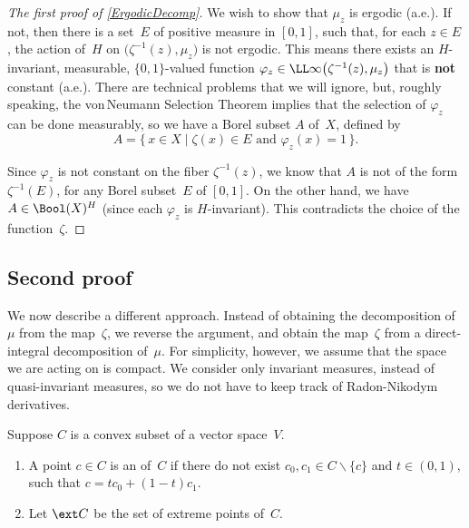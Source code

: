 \begin{proof}[The first proof of \cref{ErgodicDecomp}]
We wish to show that $\mu_z$ is ergodic (a.e.). If not, then there is a set~$E$ of positive measure in $[0,1]$, such that, for each $z \in E$, the action of~$H$ on $\bigl( \zeta^{-1}(z), \mu_z \bigr)$ is not ergodic. This means there exists an $H$-invariant, measurable, $\{0,1\}$-valued function $\varphi_z \in \LL\infty \bigl( \zeta^{-1}(z), \mu_z \bigr)$ that is \textbf{not} constant (a.e.).
There are technical problems that we will ignore, but, roughly speaking, the  von\,Neumann Selection Theorem  implies that the selection of $\varphi_z$ can be done measurably, so we have a Borel subset $A$ of~$X$, defined by
	$$ A = \{\, x \in X \mid \text{$\zeta(x) \in E$ and $\varphi_z(x) = 1 $} \,\} .$$

Since $\varphi_z$ is not constant on the fiber $\zeta^{-1}(z)$, we know that $A$ is not of the form $\zeta^{-1}(E)$, for any Borel subset~$E$ of $[0,1]$. On the other hand, we have $A \in \Bool(X)^H$ (since each $\varphi_z$ is $H$-invariant). This contradicts the choice of the function~$\zeta$.
\end{proof}


\subsection{Second proof} \label{ErgDecompPfChoquet}
We now describe a different approach. Instead of obtaining the decomposition of~$\mu$ from the map~$\zeta$, we reverse the argument, and obtain the map~$\zeta$ from a direct-integral decomposition of~$\mu$. 
For simplicity, however, we assume that the space we are acting on is compact. We consider only invariant measures, instead of quasi-invariant measures, so we do not have to keep track of Radon-Nikodym derivatives.

\begin{defns}
Suppose $C$ is a convex subset of a vector space~$V$.
	\begin{enumerate}
	\item A point $c \in C$ is an  of~$C$ if there do not exist $c_0,c_1 \in C \smallsetminus \{c\}$ and $t \in (0,1)$, such that $c = t c_0 + (1-t)c_1$.
	\item Let $\ext C$ be the set of extreme points of~$C$.
	\end{enumerate}
\end{defns}

